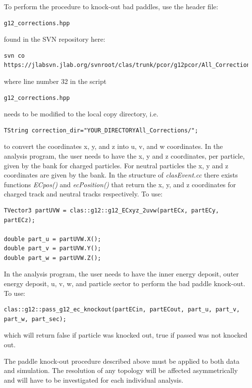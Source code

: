 To perform the procedure to knock-out bad  paddles, use the header file:
\begin{verbatim}
g12_corrections.hpp
\end{verbatim}
found in the SVN repository here:
\begin{verbatim}
svn co https://jlabsvn.jlab.org/svnroot/clas/trunk/pcor/g12pcor/All_Corrections
\end{verbatim}
where line number 32 in the script 
\begin{verbatim}
g12_corrections.hpp
\end{verbatim}
needs to be modified to the local copy directory, i.e.
\begin{verbatim}
TString correction_dir="YOUR_DIRECTORYAll_Corrections/";
\end{verbatim}
to convert the  coordinates x, y, and z into u, v, and w  coordinates. In the analysis program, the user needs to have the  x, y and z coordinates, per particle, given by the  bank for charged particles. For neutral particles the  x, y and z coordinates are given by the  bank. In the structure of \emph{clasEvent.cc} there exists functions \emph{ECpos()} and \emph{ ecPosition()} that return the  x, y, and z coordinates for charged track and neutral tracks respectively. To use:
\begin{verbatim}
TVector3 partUVW = clas::g12::g12_ECxyz_2uvw(partECx, partECy, partECz);

double part_u = partUVW.X();
double part_v = partUVW.Y();
double part_w = partUVW.Z();
\end{verbatim}
In the analysis program, the user needs to have the  inner energy deposit,  outer energy deposit, u, v, w, and particle sector to perform the  bad paddle knock-out. To use:
\begin{verbatim}
clas::g12::pass_g12_ec_knockout(partECin, partECout, part_u, part_v, part_w, part_sec);
\end{verbatim}
which will return false if particle was knocked out, true if passed was not knocked out.

\begin{v2}The paddle knock-out procedure described above must be applied to both data and simulation. The resolution of any topology will be affected asymmetrically and will have to be investigated for each individual analysis.\end{v2}

\FloatBarrier
